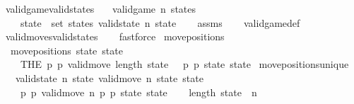 \begin{isabellebody}
\isamarkupfalse%
%
\endisatagproof
{\isafoldproof}%
%
\isadelimproof
\isanewline
%
\endisadelimproof
\isanewline
{}\isamarkupfalse%
\ valid{\isacharunderscore}game{\isacharunderscore}valid{\isacharunderscore}states{\isacharcolon}\isanewline
\ \ \ {\isachardoublequoteopen}valid{\isacharunderscore}game\ n\ states{\isachardoublequoteclose}\isanewline
\ \ \ {\isachardoublequoteopen}{\isasymforall}\ state\ {\isasymin}\ set\ states{\isachardot}\ valid{\isacharunderscore}state\ n\ state{\isachardoublequoteclose}\isanewline
%
\isadelimproof
\ \ %
\endisadelimproof
%
\isatagproof
{}\isamarkupfalse%
\ assms\isanewline
\ \ \isamarkupfalse%
\ valid{\isacharunderscore}game{\isacharunderscore}def\isanewline
\ \ \isamarkupfalse%
\ valid{\isacharunderscore}moves{\isacharunderscore}valid{\isacharunderscore}states\isanewline
\ \ \isamarkupfalse%
\ fastforce%
\endisatagproof
{\isafoldproof}%
%
\isadelimproof
\isanewline
%
\endisadelimproof
\isanewline
{}\isamarkupfalse%
\ move{\isacharunderscore}positions\ \isanewline
\ \ {\isachardoublequoteopen}move{\isacharunderscore}positions\ state\ state{\isacharprime}\ {\isacharequal}\ \isanewline
\ \ \ \ {\isacharparenleft}THE\ {\isacharparenleft}p{}{\isacharcomma}\ p{}{\isacharparenright}{\isachardot}\ valid{\isacharunderscore}move{\isacharprime}\ {\isacharparenleft}length\ state\ {\isacharminus}\ {}{\isacharparenright}\ p{}\ p{}\ state\ state{\isacharprime}{\isacharparenright}{\isachardoublequoteclose}\isanewline
\isanewline
{}\isamarkupfalse%
\ move{\isacharunderscore}positions{\isacharunderscore}unique{\isacharcolon}\isanewline
\ \ \ {\isachardoublequoteopen}valid{\isacharunderscore}state\ n\ state{\isachardoublequoteclose}\ {\isachardoublequoteopen}valid{\isacharunderscore}move\ n\ state\ state{\isacharprime}{\isachardoublequoteclose}\isanewline
\ \ \ {\isachardoublequoteopen}{\isasymexists}{\isacharbang}\ {\isacharparenleft}p{}{\isacharcomma}\ p{}{\isacharparenright}{\isachardot}\ valid{\isacharunderscore}move{\isacharprime}\ n\ p{}\ p{}\ state\ state{\isacharprime}{\isachardoublequoteclose}\isanewline
%
\isadelimproof
%
\endisadelimproof
%
\isatagproof
{}\isamarkupfalse%
{\isacharminus}\isanewline
\ \ \isamarkupfalse%
\ {\isachardoublequoteopen}length\ state\ {\isacharequal}\ n\ {\isacharplus}\ {}{\isachardoublequoteclose}\isanewline

\end{isabellebody}
